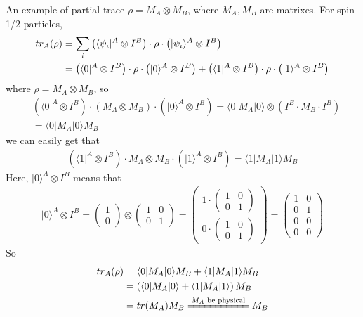 \documentclass[UTF8,12pt]{article} %
\begin{document}
\begin{myboxes}{An example of partial trace}{}
$\rho = M_{A} \otimes M_{B}$, where $M_{A}, M_{B}$ are matrixes. For spin-1/2 particles,
\begin{align}
tr_{A}(\rho) &= \sum_{i} \left(\langle\psi_{i}|^{A} \otimes I^{B}\right) \cdot \rho \cdot \left(|\psi_{i}\rangle^{A} \otimes I^{B}\right) \notag\\
&= \left(\langle0|^{A} \otimes I^{B}\right) \cdot \rho \cdot \left(|0\rangle^{A} \otimes I^{B}\right) + \left(\langle1|^{A} \otimes I^{B}\right) \cdot \rho \cdot \left(|1\rangle^{A} \otimes I^{B}\right)
\end{align}
where $\rho = M_{A} \otimes M_{B}$, so
\begin{align}
&\left(\langle0|^{A} \otimes I^{B}\right) \cdot \left(M_{A} \otimes M_{B}\right) \cdot \left(|0\rangle^{A} \otimes I^{B}\right) = \langle0|M_{A}|0\rangle \otimes \left(I^{B}\cdot M_{B} \cdot I^{B}\right)\\
&= \langle0|M_{A}|0\rangle M_{B}
\end{align}
we can easily get that
\begin{align}
\left(\langle1|^{A} \otimes I^{B}\right) \cdot M_{A} \otimes M_{B} \cdot \left(|1\rangle^{A} \otimes I^{B}\right) = \langle1|M_{A}|1\rangle M_{B}
\end{align}
Here, $|0\rangle^{A} \otimes I^{B}$ means that
\begin{align}
|0\rangle^{A} \otimes I^{B} = \begin{pmatrix}1\\0\end{pmatrix} \otimes \begin{pmatrix}1&0\\0&1\end{pmatrix} = \begin{pmatrix}1\cdot\begin{pmatrix}1&0\\0&1\end{pmatrix}\\0\cdot\begin{pmatrix}1&0\\0&1\end{pmatrix}\end{pmatrix} = \begin{pmatrix}1&0\\0&1\\0&0\\0&0\end{pmatrix}
\end{align}
So
\begin{align}
tr_{A}(\rho) &= \langle0|M_{A}|0\rangle M_{B} + \langle1|M_{A}|1\rangle M_{B} \\
&= \left(\langle0|M_{A}|0\rangle + \langle1|M_{A}|1\rangle\right) M_{B} \\
&= tr(M_{A}) M_{B} \xlongequal{M_{A}\text{ be physical}} M_{B}
\end{align}
\end{myboxes}
\end{document}
